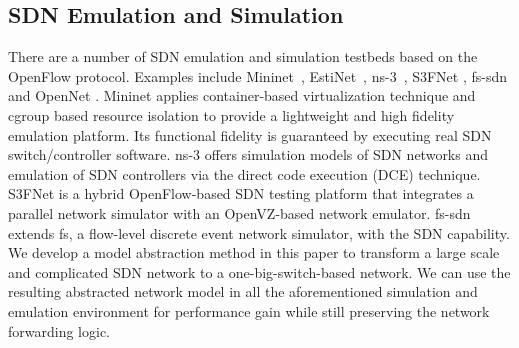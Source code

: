 \subsection{SDN Emulation and Simulation}
There are a number of SDN emulation and simulation testbeds based on the OpenFlow
protocol.
Examples include Mininet~\cite{Mininet}, EstiNet~\cite{Estinet}, ns-3~\cite{NS3},
S3FNet \cite{S3F_website}, fs-sdn \cite{FSSDN} and OpenNet \cite{OpenNet}.
Mininet  \cite{Mininet} applies container-based virtualization technique and cgroup based resource isolation to provide a lightweight and high fidelity emulation
platform.
Its functional fidelity is guaranteed by executing real SDN switch/controller software.
ns-3 \cite{NS3} offers simulation models of SDN networks and emulation of SDN controllers via the direct code execution (DCE) technique.
S3FNet \cite{S3F_website} is a hybrid OpenFlow-based SDN testing platform that integrates a parallel network simulator with an OpenVZ-based network emulator.
fs-sdn \cite{FSSDN} extends fs, a flow-level discrete event network simulator, with the SDN capability.
We develop a model abstraction method in this paper to transform a large scale and complicated SDN network to a one-big-switch-based network.
We can use the resulting abstracted network model in all the aforementioned simulation and emulation environment for performance gain while still preserving the network forwarding logic.
